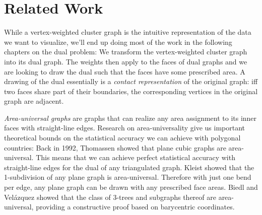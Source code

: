 \section{Related Work}
\label{sect:related-work}



While a vertex-weighted cluster graph is the intuitive representation of the data we want to visualize, we'll end up doing most of the work in the following chapters on the dual problem: We transform the vertex-weighted cluster graph into its dual graph. The weights then apply to the faces of dual graphs and we are looking to draw the dual such that the faces have some prescribed area. A drawing of the dual essentially is a \emph{contact representation} of the original graph: iff two faces share part of their boundaries, the corresponding vertices in the original graph are adjacent.

\emph{Area-universal graphs} are graphs that can realize any area assignment to its inner faces with straight-line edges. Research on area-universality give us important theoretical bounds on the statistical accuracy we can achieve with polygonal countries: Back in 1992, Thomassen \cite{thomassen1992plane} showed that plane cubic graphs are area-universal. This means that we can achieve perfect statistical accuracy with straight-line edges for the dual of any triangulated graph. Kleist \cite{kleist2018drawing} \cite{kleist2019planar} showed that the 1-subdivision of any plane graph is area-universal. Therefore with just one bend per edge, any plane graph can be drawn with any prescribed face areas. Biedl and Velázquez \cite{biedl2013drawing} showed that the class of 3-trees and subgraphs thereof are area-universal, providing a constructive proof based on barycentric coordinates.

